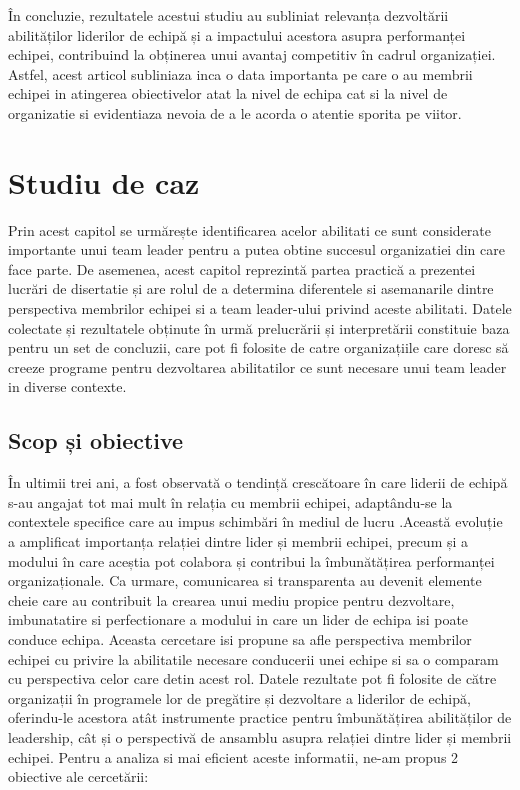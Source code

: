 \documentclass[a4paper, 12pt]{article}
\begin{document}
\begin{itemize}
	\quad În concluzie, rezultatele acestui studiu au subliniat relevanța dezvoltării abilităților liderilor de echipă și a impactului acestora asupra performanței echipei, contribuind la obținerea unui avantaj competitiv în cadrul organizației. Astfel, acest articol subliniaza inca o data importanta pe care o au membrii echipei in atingerea obiectivelor atat la nivel de echipa cat si la nivel de organizatie si evidentiaza nevoia de a le acorda o atentie sporita pe viitor.


\newpage
\end{itemize}

\setcounter{section}{2}
	\section{Studiu de caz }

	\quad\quad Prin acest capitol se urmărește identificarea acelor abilitati ce sunt  considerate importante unui team leader pentru a putea obtine succesul organizatiei din care face parte. De asemenea, acest capitol reprezintă partea practică a prezentei lucrări de disertatie și are rolul de a determina diferentele si asemanarile dintre perspectiva membrilor echipei si a team leader-ului privind  aceste abilitati. Datele colectate și rezultatele obținute în urmă prelucrării și interpretării constituie baza pentru un set de concluzii, care pot fi folosite de catre organizațiile care doresc să creeze programe pentru dezvoltarea abilitatilor ce sunt necesare unui team leader in diverse contexte.

	\subsection{Scop și obiective}
	
	\quad În ultimii trei ani, a fost observată o tendință crescătoare în care liderii de echipă s-au angajat tot mai mult în relația cu membrii echipei, adaptându-se la contextele specifice care au impus schimbări în mediul de lucru .Această evoluție a amplificat importanța relației dintre lider și membrii echipei, precum și a modului în care aceștia pot colabora și contribui la îmbunătățirea performanței organizaționale. Ca urmare, comunicarea si transparenta au devenit elemente cheie care au contribuit la crearea unui mediu propice pentru dezvoltare, imbunatatire si perfectionare a modului in care un lider de echipa isi poate conduce echipa. Aceasta cercetare isi propune sa afle perspectiva membrilor echipei cu privire la abilitatile necesare conducerii unei echipe si sa o comparam cu perspectiva celor care detin acest rol. Datele rezultate  pot fi folosite de către organizații în programele lor de pregătire și dezvoltare a liderilor de echipă, oferindu-le acestora atât instrumente practice pentru îmbunătățirea abilităților de leadership, cât și o perspectivă de ansamblu asupra relației dintre lider și membrii echipei. Pentru a analiza si mai eficient aceste informatii, ne-am propus 2 obiective ale cercetării: 
\end{document}
